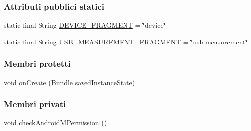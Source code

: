 \subsubsection*{Attributi pubblici statici}
\begin{DoxyCompactItemize}
\item 
static final String \hyperlink{classit_1_1unibo_1_1torsello_1_1bluetoothpositioning_1_1activities_1_1MainActivity_a2f77c0245ac2525dc58905e38e1817d1_a2f77c0245ac2525dc58905e38e1817d1}{D\+E\+V\+I\+C\+E\+\_\+\+F\+R\+A\+G\+M\+E\+NT} = \char`\"{}device\char`\"{}
\item 
static final String \hyperlink{classit_1_1unibo_1_1torsello_1_1bluetoothpositioning_1_1activities_1_1MainActivity_a64bac06e6db556ba1e36c8773e61137b_a64bac06e6db556ba1e36c8773e61137b}{U\+S\+B\+\_\+\+M\+E\+A\+S\+U\+R\+E\+M\+E\+N\+T\+\_\+\+F\+R\+A\+G\+M\+E\+NT} = \char`\"{}usb measurement\char`\"{}
\end{DoxyCompactItemize}
\subsubsection*{Membri protetti}
\begin{DoxyCompactItemize}
\item 
void \hyperlink{classit_1_1unibo_1_1torsello_1_1bluetoothpositioning_1_1activities_1_1MainActivity_a8ffa5fa91fb4ae13a758a12682872a79_a8ffa5fa91fb4ae13a758a12682872a79}{on\+Create} (Bundle saved\+Instance\+State)
\end{DoxyCompactItemize}
\subsubsection*{Membri privati}
\begin{DoxyCompactItemize}
\item 
void \hyperlink{classit_1_1unibo_1_1torsello_1_1bluetoothpositioning_1_1activities_1_1MainActivity_ab762aac3d11f5b0ccc6042a140804d5d_ab762aac3d11f5b0ccc6042a140804d5d}{check\+Android\+M\+Permission} ()
\end{DoxyCompactItemize}
